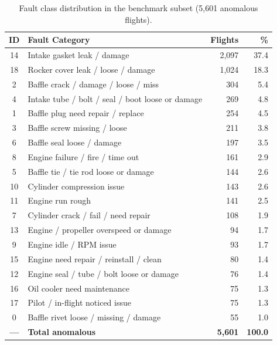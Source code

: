 \begin{table}[H]
    \centering
    \caption{Fault class distribution in the benchmark subset (5{,}601 anomalous flights).}
    \label{tab:class_dist}
    \begin{tabular}{clrr}
        \toprule
        \textbf{ID} & \textbf{Fault Category} & \textbf{Flights} & \textbf{\%} \\
        \midrule
        14 & Intake gasket leak / damage         & 2{,}097 & 37.4 \\
        18 & Rocker cover leak / loose / damage  & 1{,}024 & 18.3 \\
         2 & Baffle crack / damage / loose / miss &   304  &  5.4 \\
         4 & Intake tube / bolt / seal / boot loose or damage & 269 & 4.8 \\
         1 & Baffle plug need repair / replace    &   254  &  4.5 \\
         3 & Baffle screw missing / loose         &   211  &  3.8 \\
         6 & Baffle seal loose / damage           &   197  &  3.5 \\
         8 & Engine failure / fire / time out     &   161  &  2.9 \\
         5 & Baffle tie / tie rod loose or damage &   144  &  2.6 \\
        10 & Cylinder compression issue           &   143  &  2.6 \\
        11 & Engine run rough                     &   141  &  2.5 \\
         7 & Cylinder crack / fail / need repair  &   108  &  1.9 \\
        13 & Engine / propeller overspeed or damage &   94  &  1.7 \\
         9 & Engine idle / RPM issue              &    93  &  1.7 \\
        15 & Engine need repair / reinstall / clean &   80  &  1.4 \\
        12 & Engine seal / tube / bolt loose or damage &  76 & 1.4 \\
        16 & Oil cooler need maintenance          &    75  &  1.3 \\
        17 & Pilot / in-flight noticed issue      &    75  &  1.3 \\
         0 & Baffle rivet loose / missing / damage &   55  &  1.0 \\
        \midrule
        \textbf{---} & \textbf{Total anomalous} & \textbf{5{,}601} & \textbf{100.0} \\
        \bottomrule
    \end{tabular}
\end{table}

